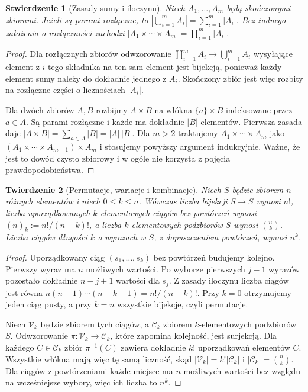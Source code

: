 \documentclass[11pt,a4paper,oneside]{report}
\numberwithin{equation}{chapter}
\theoremstyle{plain}
\newtheorem{twierdzenie}{Twierdzenie}[chapter]
\newtheorem{stwierdzenie}[twierdzenie]{Stwierdzenie}
\theoremstyle{definition}
\theoremstyle{remark}
\begin{document}
\begin{stwierdzenie}[Zasady sumy i iloczynu]
Niech $A_1,\dots,A_m$ będą skończonymi zbiorami.
Jeżeli są parami rozłączne, to $|\bigcup_{i=1}^m A_i|=\sum_{i=1}^m|A_i|$.
Bez żadnego założenia o rozłączności zachodzi
$|A_1\times\cdots\times A_m|=\prod_{i=1}^m|A_i|$.
\end{stwierdzenie}
\begin{proof}
Dla rozłącznych zbiorów odwzorowanie
$\coprod_{i=1}^m A_i\to\bigcup_{i=1}^m A_i$
wysyłające element z $i$-tego składnika na ten sam element
jest bijekcją, ponieważ każdy element sumy należy do
dokładnie jednego z $A_i$. Skończony zbiór jest więc
rozbity na rozłączne części o licznościach $|A_i|$.

Dla dwóch zbiorów $A,B$ rozbijmy $A\times B$ na włókna
$\{a\}\times B$ indeksowane przez $a\in A$.
Są parami rozłączne i każde ma dokładnie $|B|$ elementów.
Pierwsza zasada daje
$|A\times B|=\sum_{a\in A}|B|=|A|\,|B|$.
Dla $m>2$ traktujemy
$A_1\times\cdots\times A_m$ jako
$(A_1\times\cdots\times A_{m-1})\times A_m$
i stosujemy powyższy argument indukcyjnie.
Ważne, że jest to dowód czysto zbiorowy i w ogóle
nie korzysta z pojęcia prawdopodobieństwa.
\end{proof}

\begin{twierdzenie}[Permutacje, wariacje i kombinacje]
Niech $S$ będzie zbiorem $n$ różnych elementów i niech $0\leq k\leq n$.
Wówczas liczba bijekcji $S\to S$ wynosi $n!$, liczba uporządkowanych
$k$-elementowych ciągów bez powtórzeń wynosi
$(n)_k:=n!/(n-k)!$, a liczba $k$-elementowych podzbiorów $S$ wynosi
$\binom nk$. Liczba ciągów długości $k$ o wyrazach w $S$, z dopuszczeniem
powtórzeń, wynosi $n^k$.
\end{twierdzenie}
\begin{proof}
Uporządkowany ciąg $(s_1,\ldots,s_k)$ bez powtórzeń
budujemy kolejno. Pierwszy wyraz ma $n$ możliwych wartości.
Po wyborze pierwszych $j-1$ wyrazów pozostało dokładnie
$n-j+1$ wartości dla $s_j$. Z zasady iloczynu liczba
ciągów jest równa
$n(n-1)\cdots(n-k+1)=n!/(n-k)!$.
Przy $k=0$ otrzymujemy jeden ciąg pusty,
a przy $k=n$ wszystkie bijekcje, czyli permutacje.

Niech $\mathcal V_k$ będzie zbiorem tych ciągów, a
$\mathcal C_k$ zbiorem $k$-elementowych podzbiorów $S$.
Odwzorowanie $\pi:\mathcal V_k\to\mathcal C_k$,
które zapomina kolejność, jest surjekcją. Dla
każdego $C\in\mathcal C_k$ zbiór $\pi^{-1}(C)$
zawiera dokładnie $k!$ uporządkowań elementów $C$.
Wszystkie włókna mają więc tę samą liczność, skąd
$|\mathcal V_k|=k!|\mathcal C_k|$ i
$|\mathcal C_k|=\binom nk$.
Dla ciągów z powtórzeniami każde miejsce ma $n$
możliwych wartości bez względu na wcześniejsze wybory,
więc ich liczba to $n^k$.
\end{proof}
\end{document}
